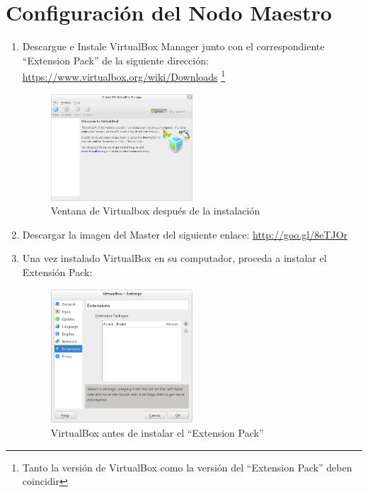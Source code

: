 \section{Configuración del Nodo Maestro}
\begin{enumerate}

\item Descargue e Instale VirtualBox Manager junto con el correspondiente ``Extension Pack'' de la siguiente dirección: \url{https://www.virtualbox.org/wiki/Downloads} \footnote{Tanto la versión de VirtualBox como la versión del ``Extension Pack'' deben coincidir}

	\begin{figure}[H]
		\centering
		\includegraphics[width=0.5\textwidth]{aux/vb_instalado}
		\caption{Ventana de Virtualbox después de la instalación}
		\label{vb_instalado}
	\end{figure}


\item Descargar la imagen del Master del siguiente enlace: \url{http://goo.gl/8eTJOr}

\item Una vez instalado VirtualBox en su computador, proceda a instalar el Extensión Pack: 
	
	\begin{figure}[H]
		\centering
		\includegraphics[width=0.5\textwidth]{aux/sinextensionpack}
		\caption{VirtualBox antes de instalar el ``Extension Pack''}
	\end{figure}
	

\end{enumerate}
